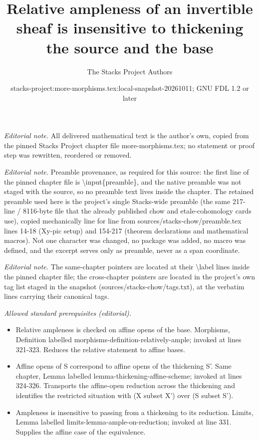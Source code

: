 \documentclass[10pt,a4paper]{amsart}
\title{Relative ampleness of an invertible sheaf is insensitive to thickening the source and the base}
\author{The Stacks Project Authors}
\date{stacks-project:more-morphisms.tex:local-snapshot-20261011; GNU FDL 1.2 or later}
\theoremstyle{plain}
\theoremstyle{definition}
\theoremstyle{remark}
\numberwithin{equation}{subsection}
\begin{document}
\maketitle
\noindent\textit{Editorial note.} All delivered mathematical text is the author's own, copied from the pinned Stacks Project chapter file more-morphisms.tex; no statement or proof step was rewritten, reordered or removed.\par\medskip
\noindent\textit{Editorial note.} Preamble provenance, as required for this source: the first line of the pinned chapter file is \textbackslash{}input\{preamble\}, and the native preamble was not staged with the source, so no preamble text lives inside the chapter. The retained preamble used here is the project's single Stacks-wide preamble (the same 217-line / 8116-byte file that the already published chow and etale-cohomology cards use), copied mechanically line for line from sources/stacks-chow/preamble.tex lines 14-18 (Xy-pic setup) and 154-217 (theorem declarations and mathematical macros). Not one character was changed, no package was added, no macro was defined, and the excerpt serves only as preamble, never as a span coordinate.\par\medskip
\noindent\textit{Editorial note.} The same-chapter pointers are located at their \textbackslash{}label lines inside the pinned chapter file; the cross-chapter pointers are located in the project's own tag list staged in the snapshot (sources/stacks-chow/tags.txt), at the verbatim lines carrying their canonical tags.\par\medskip
\noindent\textit{Allowed standard prerequisites (editorial).}\begin{itemize}
\item Relative ampleness is checked on affine opens of the base. Morphisms, Definition labelled morphisms-definition-relatively-ample; invoked at lines 321-323. Reduces the relative statement to affine bases.
\item Affine opens of S correspond to affine opens of the thickening S'. Same chapter, Lemma labelled lemma-thickening-affine-scheme; invoked at lines 324-326. Transports the affine-open reduction across the thickening and identifies the restricted situation with (X subset X') over (S subset S').
\item Ampleness is insensitive to passing from a thickening to its reduction. Limits, Lemma labelled limits-lemma-ample-on-reduction; invoked at line 331. Supplies the affine case of the equivalence.
\end{itemize}\medskip
\end{document}
